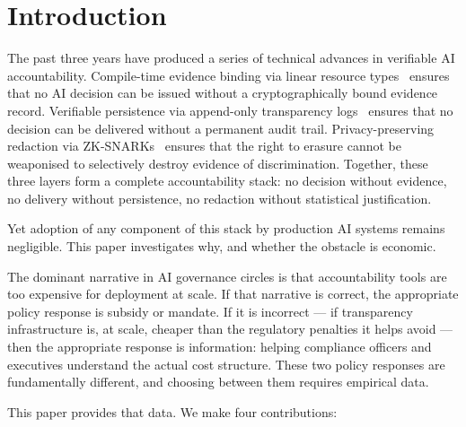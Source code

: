 \section{Introduction}
\label{sec:intro}

The past three years have produced a series of technical advances in
verifiable AI accountability. Compile-time evidence binding via linear
resource types~\cite{btv2026} ensures that no AI decision can be
issued without a cryptographically bound evidence record. Verifiable
persistence via append-only transparency logs~\cite{btv-t-repo} ensures
that no decision can be delivered without a permanent audit trail.
Privacy-preserving redaction via ZK-SNARKs~\cite{btv-ar2026} ensures
that the right to erasure cannot be weaponised to selectively destroy
evidence of discrimination. Together, these three layers form a
complete accountability stack: no decision without evidence, no
delivery without persistence, no redaction without statistical
justification.

Yet adoption of any component of this stack by production AI systems
remains negligible. This paper investigates why, and whether the
obstacle is economic.

The dominant narrative in AI governance circles is that accountability
tools are too expensive for deployment at scale. If that narrative is
correct, the appropriate policy response is subsidy or mandate.
If it is incorrect --- if transparency infrastructure is, at scale,
cheaper than the regulatory penalties it helps avoid --- then the
appropriate response is information: helping compliance officers and
executives understand the actual cost structure. These two policy
responses are fundamentally different, and choosing between them
requires empirical data.

This paper provides that data. We make four contributions:

